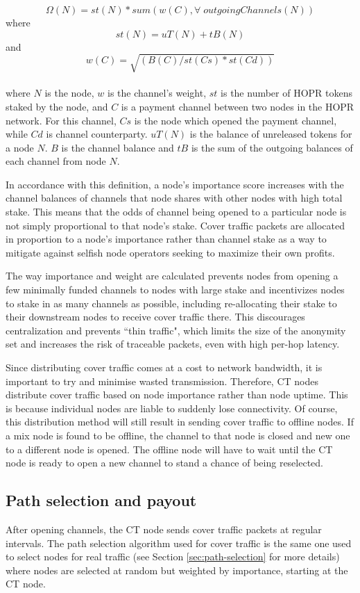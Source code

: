 $$\Omega(N) = st(N) * sum(w(C), \forall \; outgoingChannels(N))$$
where 
$$st(N) = uT(N) + tB(N)$$
and 
$$w(C) = \sqrt{(B(C) / st(Cs) * st(Cd))}$$
\\
where $N$ is the node, $w$ is the channel's weight, $st$ is the number of HOPR tokens staked by the node, and $C$ is a payment channel between two nodes in the HOPR network. For this channel, $Cs$ is the node which opened the payment channel, while $Cd$ is channel counterparty. $uT(N)$ is the balance of unreleased tokens for a node $N$. $B$ is the channel balance and $tB$ is the sum of the outgoing balances of each channel from node $N$.

 In accordance with this definition, a node's importance score increases with the channel balances of channels that node shares with other nodes with high total stake. This means that the odds of channel being opened to a particular node is not simply proportional to that node’s stake. Cover traffic packets are allocated in proportion to a node's importance rather than channel stake as a way to mitigate against selfish node operators seeking to maximize their own profits.

The way importance and weight are calculated prevents nodes from opening a few minimally funded channels to nodes with large stake and incentivizes nodes to stake in as many channels as possible,  including re-allocating their stake to their downstream nodes to receive cover traffic there. This discourages centralization and prevents ``thin traffic", which limits the size of the anonymity set and increases the risk of traceable packets, even with high per-hop latency.

Since distributing cover traffic comes at a cost to network bandwidth, it is important to try and minimise wasted transmission. Therefore, CT nodes distribute cover traffic based on node importance rather than node uptime. This is because individual nodes are liable to suddenly lose connectivity. Of course, this distribution method will still result in sending cover traffic to offline nodes. If a mix node is found to be offline, the channel to that node is closed and new one to a different node is opened. The offline node will have to wait until the CT node is ready to open a new channel to stand a chance of being reselected.

\subsection{Path selection and payout}
After opening channels, the CT node sends cover traffic packets at regular intervals. The path selection algorithm used for cover traffic is the same one used to select nodes for real traffic (see Section \ref{sec:path-selection} for more details) where nodes are selected at random but weighted by importance, starting at the CT node.

